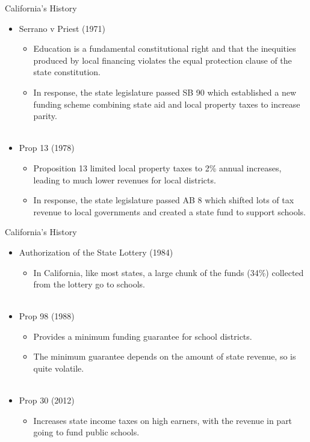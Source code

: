 \documentclass{beamer}
\begin{document}
\begin{frame}{California's History}
\begin{itemize}
\item Serrano v Priest (1971)
	\begin{itemize}
	\item Education is a fundamental constitutional right and that the inequities produced by local financing violates the equal protection clause of the state constitution. 
	\item In response, the state legislature passed SB 90 which established a new funding scheme combining state aid and local property taxes to increase parity. \\~\\
	\end{itemize}
\item Prop 13 (1978)
	\begin{itemize}
	\item Proposition 13 limited local property taxes to 2\% annual increases, leading to much lower revenues for local districts. 
	\item In response, the state legislature passed AB 8 which shifted lots of tax revenue to local governments and created a state fund to support schools. 
	\end{itemize}
\end{itemize}
\end{frame}

\begin{frame}{California's History}
\begin{itemize}
\item Authorization of the State Lottery (1984)
	\begin{itemize}
	\item In California, like most states, a large chunk of the funds (34\%) collected from the lottery go to schools. \\~\\
	\end{itemize} 
\item Prop 98 (1988)
	\begin{itemize}
	\item Provides a minimum funding guarantee for school districts. 
	\item The minimum guarantee depends on the amount of state revenue, so is quite volatile. \\~\\
	\end{itemize}
\item Prop 30 (2012)
	\begin{itemize}
	\item Increases state income taxes on high earners, with the revenue in part going to fund public schools.
	\end{itemize}
\end{itemize}
\end{frame}
\end{document}
